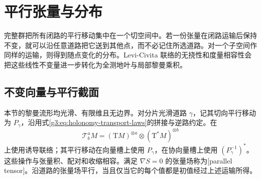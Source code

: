 
% 
% 

\section{平行张量与分布}
\label{g3:sec:0502}

完整群把所有闭路的平行移动集中在一个切空间中。若一份张量在闭路运输后保持不变，就可以沿任意道路把它送到其他点，而不必记住所选道路。对一个子空间作同样的运输，则得到随点变化的分布。Levi-Civita 联络的无挠性和度量相容性会把这些线性不变量进一步转化为全测地叶与局部黎曼乘积。

\subsection{不变向量与平行截面}
\label{g3:subsec:0502:01}

本节的黎曼流形均光滑、有限维且无边界。对分片光滑道路 \(\gamma\)，记其切向平行移动为 \(P_\gamma\)，沿用式\eqref{g3:eq:holonomy-transport-laws}的拼接与逆路约定。在
\[
	\mathcal T^a_bM=(\mathrm{T}M)^{\otimes a}
		\otimes(\mathrm{T}^*M)^{\otimes b}
\]
上使用诱导联络；其平行移动在向量槽上使用 \(P_\gamma\)，在协向量槽上使用 \((P_\gamma^{-1})^*\)。这些操作与张量积、配对和收缩相容。满足 \(\nabla S=0\) 的张量场称为[parallel tensor]。沿道路的张量场平行，当且仅当它的每个值都是初值经过上述运输所得。

